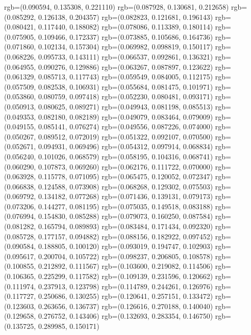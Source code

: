 {{{					rgb=(0.090594, 0.135308, 0.221110)
					rgb=(0.087928, 0.130681, 0.212658)
					rgb=(0.085292, 0.126138, 0.204357)
					rgb=(0.082823, 0.121681, 0.196143)
					rgb=(0.080421, 0.117440, 0.188082)
					rgb=(0.078086, 0.113389, 0.180114)
					rgb=(0.075905, 0.109466, 0.172337)
					rgb=(0.073885, 0.105686, 0.164736)
					rgb=(0.071860, 0.102134, 0.157304)
					rgb=(0.069982, 0.098819, 0.150117)
					rgb=(0.068226, 0.095733, 0.143111)
					rgb=(0.066537, 0.092861, 0.136321)
					rgb=(0.064955, 0.090276, 0.129886)
					rgb=(0.063267, 0.087897, 0.123622)
					rgb=(0.061329, 0.085713, 0.117743)
					rgb=(0.059549, 0.084005, 0.112175)
					rgb=(0.057509, 0.082538, 0.106931)
					rgb=(0.055684, 0.081475, 0.101971)
					rgb=(0.053860, 0.080759, 0.097418)
					rgb=(0.052230, 0.080481, 0.093171)
					rgb=(0.050913, 0.080625, 0.089271)
					rgb=(0.049943, 0.081198, 0.085513)
					rgb=(0.049353, 0.082180, 0.082189)
					rgb=(0.049079, 0.083464, 0.079009)
					rgb=(0.049155, 0.085141, 0.076274)
					rgb=(0.049556, 0.087226, 0.074000)
					rgb=(0.050267, 0.089512, 0.072019)
					rgb=(0.051322, 0.092107, 0.070500)
					rgb=(0.052671, 0.094931, 0.069496)
					rgb=(0.054312, 0.097914, 0.068834)
					rgb=(0.056240, 0.101026, 0.068579)
					rgb=(0.058195, 0.104316, 0.068741)
					rgb=(0.060290, 0.107873, 0.069260)
					rgb=(0.062176, 0.111722, 0.070000)
					rgb=(0.063928, 0.115778, 0.071095)
					rgb=(0.065475, 0.120052, 0.072347)
					rgb=(0.066838, 0.124588, 0.073908)
					rgb=(0.068268, 0.129302, 0.075503)
					rgb=(0.069792, 0.134182, 0.077268)
					rgb=(0.071436, 0.139131, 0.079173)
					rgb=(0.073206, 0.144277, 0.081195)
					rgb=(0.075035, 0.149518, 0.083188)
					rgb=(0.076994, 0.154830, 0.085288)
					rgb=(0.079073, 0.160250, 0.087584)
					rgb=(0.081282, 0.165794, 0.089893)
					rgb=(0.083484, 0.171434, 0.092320)
					rgb=(0.085728, 0.177157, 0.094882)
					rgb=(0.088156, 0.182922, 0.097452)
					rgb=(0.090584, 0.188805, 0.100120)
					rgb=(0.093019, 0.194747, 0.102903)
					rgb=(0.095617, 0.200704, 0.105722)
					rgb=(0.098237, 0.206805, 0.108578)
					rgb=(0.100855, 0.212892, 0.111567)
					rgb=(0.103600, 0.219082, 0.114506)
					rgb=(0.106365, 0.225299, 0.117582)
					rgb=(0.109139, 0.231596, 0.120662)
					rgb=(0.111974, 0.237913, 0.123798)
					rgb=(0.114789, 0.244261, 0.126976)
					rgb=(0.117727, 0.250686, 0.130255)
					rgb=(0.120641, 0.257151, 0.133472)
					rgb=(0.123603, 0.263656, 0.136737)
					rgb=(0.126616, 0.270188, 0.140040)
					rgb=(0.129658, 0.276752, 0.143406)
					rgb=(0.132693, 0.283354, 0.146750)
					rgb=(0.135725, 0.289985, 0.150171)
}}}
